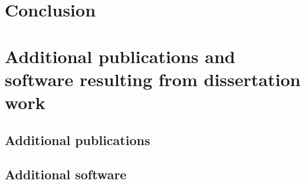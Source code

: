 \documentclass[
]{book}
\begin{document}
\hypertarget{conclusion-1}{%
\chapter{Conclusion}\label{conclusion-1}}

\hypertarget{additional-publications-and-software-resulting-from-dissertation-work}{%
\chapter*{Additional publications and software resulting from dissertation work}\label{additional-publications-and-software-resulting-from-dissertation-work}}

\hypertarget{additional-publications}{%
\section*{Additional publications}\label{additional-publications}}

\hypertarget{additional-software}{%
\section*{Additional software}\label{additional-software}}

\backmatter
\end{document}
